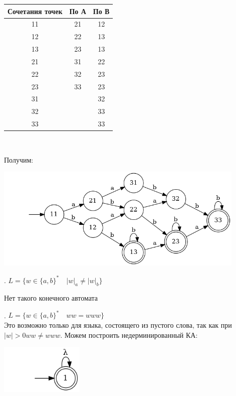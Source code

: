 \documentclass{article}
\begin{document}
    \begin{center}
        \begin{tabular}{|c|c|c|}
            \hline
            Сочетания точек & По А & По В \\
            \hline
            11 & 21 & 12\\
            12 & 22 & 13\\
            13 & 23 & 13\\
            21 & 31 & 22\\
            22 & 32 & 23\\
            23 & 33 & 23\\
            31 &  & 32\\
            32 &  & 33\\
            33 &  & 33\\
            \hline
        \end{tabular}\\
    \end{center}
    Получим:
    \begin{center}
        \includegraphics[width=0.9\textwidth]{pic5.dot}\\
    \end{center}
    . $L = \{w \in \{a, b\}^* \quad |w|_a \neq |w|_b\}$
    \begin{center}
        Нет такого конечного автомата
    \end{center}
    . $L = \{w \in \{a, b\}^* \quad ww = www\}$\\
    Это возможно только для языка, состоящего из пустого слова, так как при $|w|>0 ww \neq www$. Можем построить недерминированный КА:
    \begin{center}
        \includegraphics[width=0.3\textwidth]{pic6.dot}\\
    \end{center}
    
\end{document}
